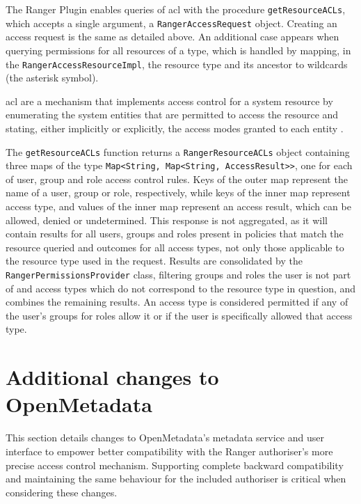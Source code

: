 The Ranger Plugin enables queries of \acrfull{acl} with the procedure \texttt{getResourceACLs}, which accepts a single argument, a \texttt{RangerAccessRequest} object. Creating an access request is the same as detailed above. An additional case appears when querying permissions for all resources of a type, which is handled by mapping, in the \texttt{RangerAccessResourceImpl}, the resource type and its ancestor to wildcards (the asterisk symbol).

\acrlong{acl} are a mechanism that implements access control for a system resource by enumerating the system entities that are permitted to access the resource and stating, either implicitly or explicitly, the access modes granted to each entity \cite{RFC4949}.

The \texttt{getResourceACLs} function returns a \texttt{RangerResourceACLs} object containing three maps of the type \texttt{Map<String, Map<String, AccessResult>>}, one for each of user, group and role access control rules. Keys of the outer map represent the name of a user, group or role, respectively, while keys of the inner map represent access type, and values of the inner map represent an access result, which can be allowed, denied or undetermined. This response is not aggregated, as it will contain results for all users, groups and roles present in policies that match the resource queried and outcomes for all access types, not only those applicable to the resource type used in the request. Results are consolidated by the \texttt{RangerPermissionsProvider} class, filtering groups and roles the user is not part of and access types which do not correspond to the resource type in question, and combines the remaining results. An access type is considered permitted if any of the user's groups for roles allow it or if the user is specifically allowed that access type.

\section{Additional changes to OpenMetadata}

This section details changes to OpenMetadata's metadata service and user interface to empower better compatibility with the Ranger authoriser's more precise access control mechanism. Supporting complete backward compatibility and maintaining the same behaviour for the included authoriser is critical when considering these changes.

